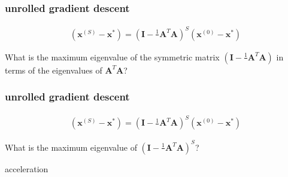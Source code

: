 \documentclass[compress]{beamer}
\newcommand{\bv}[1]{\mathbf{#1}}
\DeclareMathOperator*{\lmax}{\lambda_{max}}
\begin{document}
\begin{frame}[t]
	\frametitle{unrolled gradient descent}
	\begin{align*}
		(\bv{x}^{(S)} - \bv{x}^*) =  \left(\bv{I} - \frac{1}{\lmax}\bv{A}^T\bv{A}\right)^S(\bv{x}^{(0)} - \bv{x}^*) 
	\end{align*}

	What is the maximum eigenvalue of the symmetric matrix $\left(\bv{I} - \frac{1}{\lmax}\bv{A}^T\bv{A}\right)$ in terms of the eigenvalues of $\bv{A}^T\bv{A}$?
	
\end{frame}

\begin{frame}[t]
	\frametitle{unrolled gradient descent}
	\begin{align*}
		(\bv{x}^{(S)} - \bv{x}^*) =  \left(\bv{I} - \frac{1}{\lmax}\bv{A}^T\bv{A}\right)^S(\bv{x}^{(0)} - \bv{x}^*) 
	\end{align*}
	
	What is the maximum eigenvalue of $\left(\bv{I} - \frac{1}{\lmax}\bv{A}^T\bv{A}\right)^S$?
	
	
\end{frame}



%	
%	

\begin{frame}[standout]
	\begin{center}
		\large acceleration
	\end{center}
\end{frame}
\end{document}
